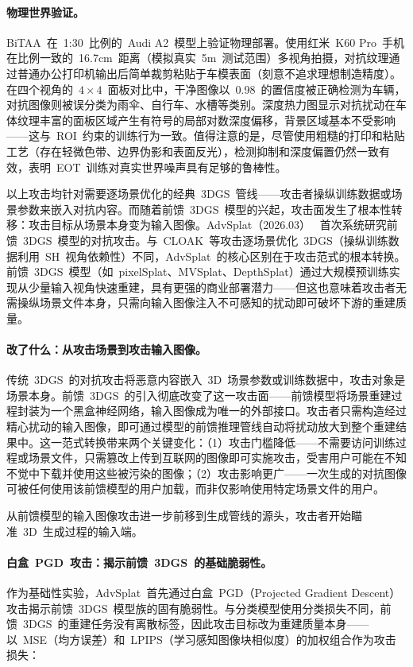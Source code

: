 \paragraph{物理世界验证。}
BiTAA~在~1:30~比例的~Audi A2~模型上验证物理部署。使用红米~K60 Pro~手机在比例一致的~16.7cm~距离（模拟真实~5m~测试范围）多视角拍摄，对抗纹理通过普通办公打印机输出后简单裁剪粘贴于车模表面（刻意不追求理想制造精度）。在四个视角的~$4 \times 4$~面板对比中，干净图像以~0.98~的置信度被正确检测为车辆，对抗图像则被误分类为雨伞、自行车、水槽等类别。深度热力图显示对抗扰动在车体纹理丰富的面板区域产生有符号的局部对数深度偏移，背景区域基本不受影响——这与~ROI~约束的训练行为一致。值得注意的是，尽管使用粗糙的打印和粘贴工艺（存在轻微色带、边界伪影和表面反光），检测抑制和深度偏置仍然一致有效，表明~EOT~训练对真实世界噪声具有足够的鲁棒性。

以上攻击均针对需要逐场景优化的经典~3DGS~管线——攻击者操纵训练数据或场景参数来嵌入对抗内容。而随着前馈~3DGS~模型的兴起，攻击面发生了根本性转移：攻击目标从场景本身变为输入图像。AdvSplat（2026.03）~\cite{2603_23686} 首次系统研究前馈~3DGS~模型的对抗攻击。与~CLOAK~等攻击逐场景优化~3DGS（操纵训练数据利用~SH~视角依赖性）不同，AdvSplat~的核心区别在于攻击范式的根本转换。前馈~3DGS~模型（如~pixelSplat、MVSplat、DepthSplat）通过大规模预训练实现从少量输入视角快速重建，具有更强的商业部署潜力——但这也意味着攻击者无需操纵场景文件本身，只需向输入图像注入不可感知的扰动即可破坏下游的重建质量。

\paragraph{改了什么：从攻击场景到攻击输入图像。}
传统~3DGS~的对抗攻击将恶意内容嵌入~3D~场景参数或训练数据中，攻击对象是场景本身。前馈~3DGS~的引入彻底改变了这一攻击面——前馈模型将场景重建过程封装为一个黑盒神经网络，输入图像成为唯一的外部接口。攻击者只需构造经过精心扰动的输入图像，即可通过模型的前馈推理管线自动将扰动放大到整个重建结果中。这一范式转换带来两个关键变化：（1）攻击门槛降低——不需要访问训练过程或场景文件，只需篡改上传到互联网的图像即可实施攻击，受害用户可能在不知不觉中下载并使用这些被污染的图像；（2）攻击影响更广——一次生成的对抗图像可被任何使用该前馈模型的用户加载，而非仅影响使用特定场景文件的用户。

从前馈模型的输入图像攻击进一步前移到生成管线的源头，攻击者开始瞄准~3D~生成过程的输入端。

\paragraph{白盒~PGD~攻击：揭示前馈~3DGS~的基础脆弱性。}
作为基础性实验，AdvSplat~首先通过白盒~PGD（Projected Gradient Descent）攻击揭示前馈~3DGS~模型族的固有脆弱性。与分类模型使用分类损失不同，前馈~3DGS~的重建任务没有离散标签，因此攻击目标改为重建质量本身——以~MSE（均方误差）和~LPIPS（学习感知图像块相似度）的加权组合作为攻击损失：

